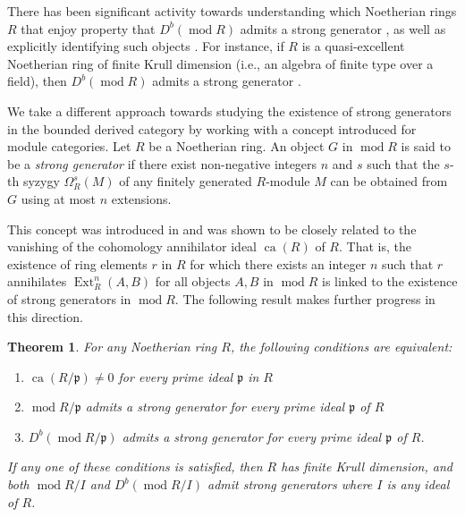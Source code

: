 \documentclass[11pt]{amsart}
\newcounter{intro}
\newtheorem{introthm}[intro]{Theorem}
\theoremstyle{plain}
\theoremstyle{definition}
\numberwithin{equation}{section}
\numberwithin{theorem}{section}
\begin{document}
There has been significant activity towards understanding which Noetherian rings $R$ that enjoy property that $D^b(\operatorname{mod}R)$ admits a strong generator \cite{Rouquier:2008, Iyengar/Takahashi:2016, Aoki:2021}, as well as explicitly identifying such objects \cite{BILMP:2023}. For instance, if $R$ is a quasi-excellent Noetherian ring of finite Krull dimension (i.e., an algebra of finite type over a field), then $D^b(\operatorname{mod}R)$ admits a strong generator \cite{Aoki:2021}.

We take a different approach towards studying the existence of strong generators in the bounded derived category by working with a concept introduced for module categories. Let $R$ be a Noetherian ring. An object $G$ in $\operatorname{mod}R$ is said to be a \textit{strong generator} if there exist non-negative integers $n$ and $s$ such that the $s$-th syzygy $\Omega^s_R(M)$ of any finitely generated $R$-module $M$ can be obtained from $G$ using at most $n$ extensions.

This concept was introduced in \cite{Iyengar/Takahashi:2016} and was shown to be closely related to the vanishing of the cohomology annihilator ideal $\operatorname{ca}(R)$ of $R$. That is, the existence of ring elements $r$ in $R$ for which there exists an integer $n$ such that $r$ annihilates $\operatorname{Ext}^n_R(A,B)$ for all objects $A,B$ in $\operatorname{mod}R$ is linked to the existence of strong generators in $\operatorname{mod}R$. The following result makes further progress in this direction.

\begin{introthm}\label{thm:strong_generation}
    For any Noetherian ring $R$, the following conditions are equivalent:
    \begin{enumerate}
        \item $\operatorname{ca}(R/\mathfrak{p})\neq 0$ for every prime ideal $\mathfrak{p}$ in $R$
        \item $\operatorname{mod}R/\mathfrak{p}$ admits a strong generator for every prime ideal $\mathfrak{p}$ of $R$
        \item $D^b (\operatorname{mod}R/\mathfrak{p})$ admits a strong generator for every prime ideal $\mathfrak{p}$ of $R$.
    \end{enumerate}
    If any one of these conditions is satisfied, then $R$ has finite Krull dimension, and both $\operatorname{mod}R/I$ and $D^b (\operatorname{mod}R/I)$ admit strong generators where $I$ is any ideal of $R$.
\end{introthm}
\end{document}
